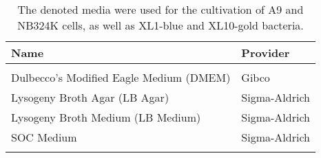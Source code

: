 \begin{center}
\begin{table}[H]
\begin{tabular}{l l}
\textbf{Name} & \textbf{Provider}\\
\hline
\\
Dulbecco's Modified Eagle Medium (DMEM) & Gibco\\
Lysogeny Broth Agar (LB Agar) & Sigma-Aldrich\\
Lysogeny Broth Medium (LB Medium) & Sigma-Aldrich\\
SOC Medium & Sigma-Aldrich\\
\\
\end{tabular}
\caption[Media]{The denoted media were used for the cultivation of A9 and NB324K cells, as well as XL1-blue and XL10-gold bacteria.}
\label{Media}
\end{table}
\end{center}